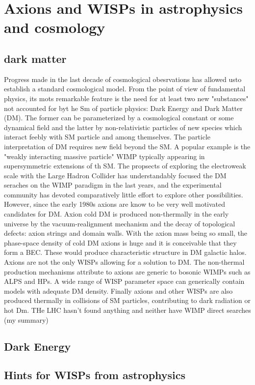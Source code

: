 \documentclass[11pt]{book}
\begin{document}
\section{Axions and WISPs in astrophysics and cosmology}
\subsection{dark matter}
Progress made in the last decade of cosmological obesrvations has allowed usto establish a standard cosmological model. From the point of view of fundamental physics, its mots remarkable feature is the need for at least two new "substances" not accounted for byt he Sm of particle physics: Dark Energy and Dark Matter (DM). The former can be parameterized by a cosmological constant or some dynamical field and the latter by non-relativistic particles of new species which interact feebly with SM particle and among themselves.
The particle interpretation of DM requires new field beyond the SM. A popular example is the "weakly interacting massive particle" WIMP typically appearing in supersymmetric extensions of th SM. The propsects of exploring the electroweak scale with the Large Hadron Collider has understandably focused the DM seraches on the WIMP paradigm in the last years, and the experimental community has devoted comparatively little effort to explore other possibilities.
However, since the early 1980s axions are know to be very well motivated candidates for DM. Axion cold DM is produced non-thermally in the early universe by the vacuum-realignment mechanism and the decay of topological defects: axion strings and  domain walls. With the axion mass being so small, the phase-space density of cold DM axions is huge and it is conceivable that they form a BEC. These would produce characteristic structure in DM galactic halos.
Axions are not the only WISPs allowing for a solution to DM. The non-thermal production mechanisms attribute to axions are generic to bosonic WIMPs such as ALPS and HPs. A wide range of WISP parameter space can generically contain models with adequate DM density. Finally axions and other WISPs are also produced thermally in collisions of SM particles, contributing to dark radiation or hot Dm.
THe LHC hasn't found anything and neither have WIMP direct searches (my summary)

\subsection{Dark Energy}
\subsection{Hints for WISPs from astrophysics}
\end{document}
